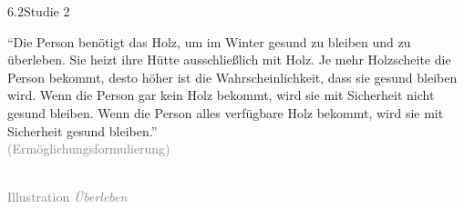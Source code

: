 \documentclass[xcolor=table,9pt,aspectratio=169]{beamer}
\begin{document}
\begin{frame}{\vspace*{10mm}6.2\hspace*{1em}Studie 2}
\begin{multicols}{2}
   \enquote{Die Person benötigt das Holz, um im Winter gesund zu bleiben und zu überleben. Sie heizt ihre Hütte ausschließlich mit Holz. Je mehr Holzscheite die Person bekommt, desto höher ist die Wahrscheinlichkeit, dass sie gesund bleiben wird. Wenn die Person gar kein Holz bekommt, wird sie mit Sicherheit nicht gesund bleiben. Wenn die Person alles verfügbare Holz bekommt, wird sie mit Sicherheit gesund bleiben.}\\
   \medskip
   \textcolor{gray}{(Ermöglichungsformulierung)}
   \vfill
   \begin{center}
      \\
      \textcolor{gray}{Illustration \textit{Überleben}}
   \end{center}
\end{multicols}
\end{frame}
\end{document}
